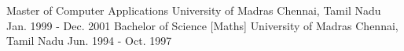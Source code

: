 \begin{cventries}
  \cventry
    {Master of Computer Applications}
    {University of Madras}
    {Chennai, Tamil Nadu}
    {Jan. 1999 - Dec. 2001}
    {
    }
  \cventry
  {Bachelor of Science [Maths]}
  {University of Madras}
  {Chennai, Tamil Nadu}
  {Jun. 1994 - Oct. 1997}
  {
  }
\end{cventries}
